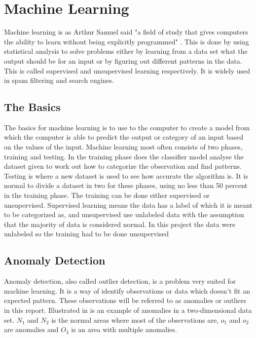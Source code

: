 \chapter{Machine Learning}
\label{chp:machine_learning}

Machine learning is as Arthur Samuel said "a field of study that gives computers the ability to learn without being explicitly programmed" \cite{samuel1959some}. This is done by using statistical analysis to solve problems either by learning from a data set what the output should be for an input or by figuring out different patterns in the data. This is called supervised and unsupervised learning respectively. It is widely used in spam filtering and search engines.

\section{The Basics}
The basics for machine learning is to use to the computer to create a model from which the computer is able to predict the output or category of an input based on the values of the input. 
Machine learning most often consists of two phases, training and testing. In the training phase does the classifier model analyse the dataset given to work out how to categorize the observation and find patterns. Testing is where a new dataset is used to see how accurate the algorithm is. It is normal to divide a dataset in two for these phases, using no less than 50 percent in the training phase.
The training can be done either supervised or unsupervised. Supervised learning means the data has a label of which it is meant to be categorized as, and unsupervised use unlabeled data with the assumption that the majority of data is considered normal. In this project the data were unlabeled so the training had to be done unsupervised

\section{Anomaly Detection}
Anomaly detection, also called outlier detection, is a problem very suited for machine learning. It is a way of identify observations or data which doesn't fit an expected pattern. These observations will be referred to as anomalies or outliers in this report. Illustrated in  is an example of anomalies in a two-dimensional data set. $N_1$ and $N_2$ is the normal areas where most of the observations are, $o_1$ and $o_2$ are anomalies and $O_3$ is an area with multiple anomalies. 

